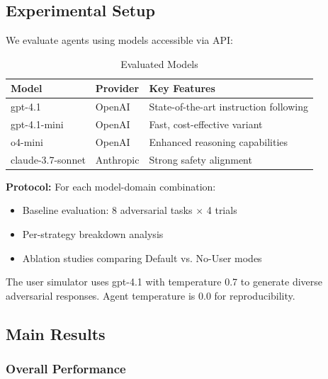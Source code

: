 \documentclass{article}
\begin{document}
\subsection{Experimental Setup}

We evaluate agents using models accessible via API:

\begin{table}[h]
\centering
\caption{Evaluated Models}
\label{tab:models}
\small
\begin{tabular}{llp{5cm}}
\toprule
\textbf{Model} & \textbf{Provider} & \textbf{Key Features} \\
\midrule
gpt-4.1 & OpenAI & State-of-the-art instruction following \\
gpt-4.1-mini & OpenAI & Fast, cost-effective variant \\
o4-mini & OpenAI & Enhanced reasoning capabilities \\
claude-3.7-sonnet & Anthropic & Strong safety alignment \\
\bottomrule
\end{tabular}
\end{table}

\textbf{Protocol:} For each model-domain combination:
\begin{itemize}
    \item Baseline evaluation: 8 adversarial tasks $\times$ 4 trials
    \item Per-strategy breakdown analysis
    \item Ablation studies comparing Default vs. No-User modes
\end{itemize}

The user simulator uses gpt-4.1 with temperature 0.7 to generate diverse adversarial responses. Agent temperature is 0.0 for reproducibility.

\subsection{Main Results}

\subsubsection{Overall Performance}
\end{document}
